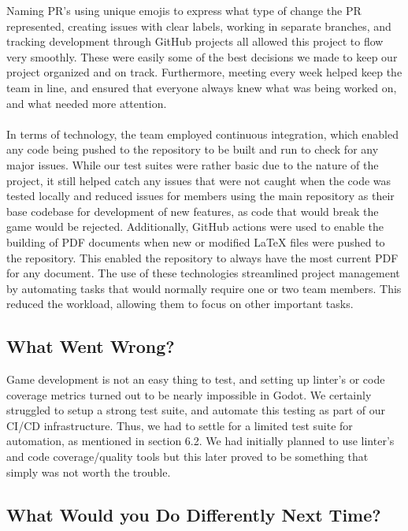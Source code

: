 \documentclass{article}
\begin{document}
Naming PR's using unique emojis to express what type of change the PR represented, creating issues with clear labels, working in separate branches, and tracking development through GitHub projects all allowed this project to flow very smoothly. These were easily some of the best decisions we made to keep our project organized and on track. Furthermore, meeting every week helped keep the team in line, and ensured that everyone always knew what was being worked on, and what needed more attention.
\\
\\
In terms of technology, the team employed continuous integration, which enabled any code being pushed to the repository to be built and run to check for any major issues. While our test suites were rather basic due to the nature of the project, it still helped catch any issues that were not caught when the code was tested locally and reduced issues for members using the main repository as their base codebase for development of new features, as code that would break the game would be rejected. Additionally, GitHub actions were used to enable the building of PDF documents when new or modified LaTeX files were pushed to the repository. This enabled the repository to always have the most current PDF for any document. The use of these technologies streamlined project management by automating tasks that would normally require one or two team members. This reduced the workload, allowing them to focus on other important tasks.

\subsection{What Went Wrong?}


Game development is not an easy thing to test, and setting up linter's or code coverage metrics turned out to be nearly impossible in Godot. We certainly struggled to setup a strong test suite, and automate this testing as part of our CI/CD infrastructure. Thus, we had to settle for a limited test suite for automation, as mentioned in section 6.2. We had initially planned to use linter's and code coverage/quality tools but this later proved to be something that simply was not worth the trouble. 

\subsection{What Would you Do Differently Next Time?}
\end{document}
